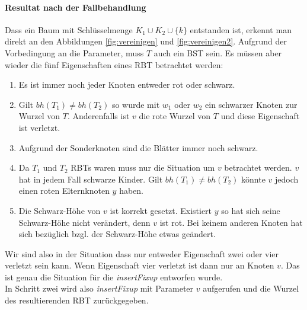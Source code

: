 \documentclass[a4paper,12pt]{article}
\begin{document}
\paragraph{Resultat nach der Fallbehandlung}
Dass ein Baum mit Schlüsselmenge  $K_1 \cup K_2 \cup \{k\} $ entstanden ist, erkennt man direkt an den Abbildungen \ref{fig:vereinigen} und \ref{fig:vereinigen2}. Aufgrund der Vorbedingung an die Parameter, muss $T$ auch ein BST sein. Es müssen aber wieder die fünf Eigenschaften eines RBT betrachtet werden:
\begin{enumerate}
	\item Es ist immer noch jeder Knoten entweder rot oder schwarz.
	\item Gilt $bh(T_1) \neq bh(T_2)$ so wurde mit $w_1$ oder $w_2$ ein schwarzer Knoten zur Wurzel von $T$. Anderenfalls ist $v$ die rote Wurzel von $T$ und diese Eigenschaft ist verletzt.   
	\item Aufgrund der Sonderknoten sind die Blätter immer noch schwarz.
	\item Da $T_1$ und $T_2$ RBTs waren muss nur die Situation um $v$ betrachtet werden. $v$ hat in jedem Fall schwarze Kinder. Gilt $bh(T_1) \neq bh(T_2)$ könnte $v$ jedoch einen roten Elternknoten $y$ haben. 
	\item Die Schwarz-Höhe von $v$ ist korrekt gesetzt. Existiert $y$ so hat sich seine Schwarz-Höhe nicht verändert, denn $v$ ist rot. Bei keinem anderen Knoten hat sich bezüglich bzgl. der Schwarz-Höhe etwas geändert. 
\end{enumerate} 
Wir sind also in der Situation dass nur entweder Eigenschaft zwei oder vier verletzt sein kann. Wenn Eigenschaft vier verletzt ist dann nur an Knoten $v$. Das ist genau die Situation für die \textit{insertFixup} entworfen wurde.\\
In Schritt zwei wird also \textit{insertFixup} mit Parameter $v$ aufgerufen und die Wurzel des resultierenden RBT zurückgegeben. 
\end{document}
